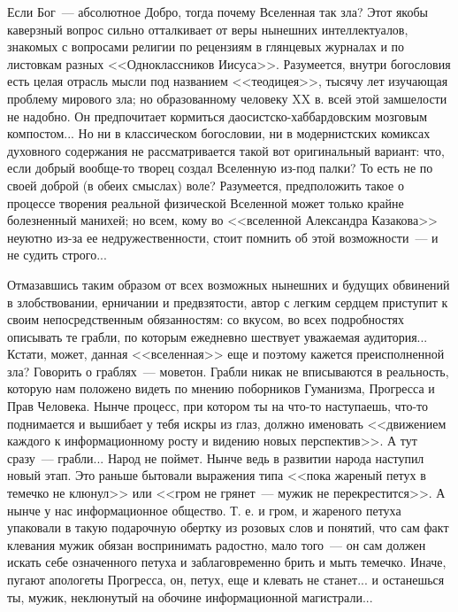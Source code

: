 \documentclass{scrbook}
\newcommand{\flqq}{<<}
\newcommand{\frqq}{>>}
\newcommand{\mdash}{~--- }
\begin{document}
Если Бог{\mdash}абсолютное Добро, тогда почему Вселенная так зла? Этот якобы каверзный вопрос сильно отталкивает от веры нынешних интеллектуалов, знакомых с вопросами религии по рецензиям в глянцевых журналах и по листовкам разных {\flqq}Одноклассников Иисуса{\frqq}. Разумеется, внутри богословия есть целая отрасль мысли под названием {\flqq}теодицея{\frqq}, тысячу лет изучающая проблему мирового зла; но образованному человеку XX в. всей этой замшелости не надобно. Он предпочитает кормиться даосистско-хаббардовским мозговым компостом... Но ни в классическом богословии, ни в модернистских комиксах духовного содержания не рассматривается такой вот оригинальный вариант: что, если добрый вообще-то творец создал Вселенную из-под палки? То есть не по своей доброй (в обеих смыслах) воле? Разумеется, предположить такое о процессе творения реальной физической Вселенной может только крайне болезненный манихей; но всем, кому во {\flqq}вселенной Александра Казакова{\frqq} неуютно из-за ее недружественности, стоит помнить об этой возможности{\mdash}и не судить строго...

Отмазавшись таким образом от всех возможных нынешних и будущих обвинений в злобствовании, ерничании и предвзятости, автор с легким сердцем приступит к своим непосредственным обязанностям: со вкусом, во всех подробностях описывать те грабли, по которым ежедневно шествует уважаемая аудитория... Кстати, может, данная {\flqq}вселенная{\frqq} еще и поэтому кажется преисполненной зла? Говорить о граблях{\mdash}моветон. Грабли никак не вписываются в реальность, которую нам положено видеть по мнению поборников Гуманизма, Прогресса и Прав Человека. Нынче процесс, при котором ты на что-то наступаешь, что-то поднимается и вышибает у тебя искры из глаз, должно именовать {\flqq}движением каждого к информационному росту и видению новых перспектив{\frqq}. А тут сразу{\mdash}грабли... Народ не поймет. Нынче ведь в развитии народа наступил новый этап. Это раньше бытовали выражения типа {\flqq}пока жареный петух в темечко не клюнул{\frqq} или {\flqq}гром не грянет{\mdash}мужик не перекрестится{\frqq}. А нынче у нас информационное общество. Т. е. и гром, и жареного петуха упаковали в такую подарочную обертку из розовых слов и понятий, что сам факт клевания мужик обязан воспринимать радостно, мало того{\mdash}он сам должен искать себе означенного петуха и заблаговременно брить и мыть темечко. Иначе, пугают апологеты Прогресса, он, петух, еще и клевать не станет... и останешься ты, мужик, неклюнутый на обочине информационной магистрали...
\end{document}

